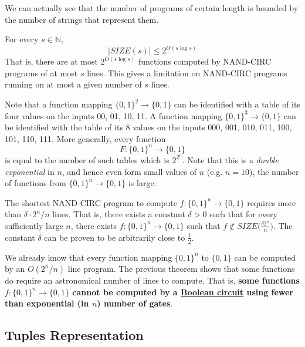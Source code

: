   We can actually see that the number of programs of certain length is bounded by the number of strings that represent them. 

  \begin{theorem}
    \label{thm:counting-programs}
  For every $s \in \mathbb{N}$, 
  \begin{equation}
    |SIZE(s)| \leq 2^{O(s \log s)}
  \end{equation}
  That is, there are at most $2^{O (s \log s)}$ functions computed by NAND-CIRC programs of at most $s$ lines. This gives a limitation on NAND-CIRC programs running on at most a given number of $s$ lines. 
  \end{theorem}

  Note that a function mapping $\{0,1\}^2 \to \{0, 1\}$ can be identified with a table of its four values on the inputs 00, 01, 10, 11. A function mapping $\{0,1\}^3 \to \{0,1\}$ can be identified with the table of its 8 values on the inputs 000, 001, 010, 011, 100, 101, 110, 111. More generally, every function 
  \begin{equation}
    F: \{0,1\}^n \to \{0,1\}
  \end{equation}
  is equal to the number of such tables which is $2^{2^n}$. Note that this is a \textit{double exponential} in $n$, and hence even form small values of $n$ (e.g. $n = 10$), the number of functions from $\{0,1\}^n \to \{0,1\}$ is large. 

  \begin{theorem}
    \label{thm:counting-argument-lower-bound}
  The shortest NAND-CIRC program to compute $f: \{0,1\}^n \to \{0,1\}$ requires more than $\delta \cdot 2^n / n$ lines. That is, there exists a constant $\delta > 0$ such that for every sufficiently large $n$, there exists $f: \{0,1\}^n \to \{0,1\}$ such that $f \not\in SIZE\Big( \frac{\delta 2^n}{n}\Big)$. The constant $\delta$ can be proven to be arbitrarily close to $\frac{1}{2}$. 
  \end{theorem}

  We already know that every function mapping $\{0,1\}^n$ to $\{0,1\}$ can be computed by an $O(2^n / n)$ line program. The previous theorem shows that some functions do require an astronomical number of lines to compute. That is, \textbf{some functions $f: \{0,1\}^n \to \{0,1\}$ cannot be computed by a \hyperref[def:boolean-circuit]{Boolean circuit} using fewer than exponential (in $n$) number of gates}. 

\subsection{Tuples Representation}

